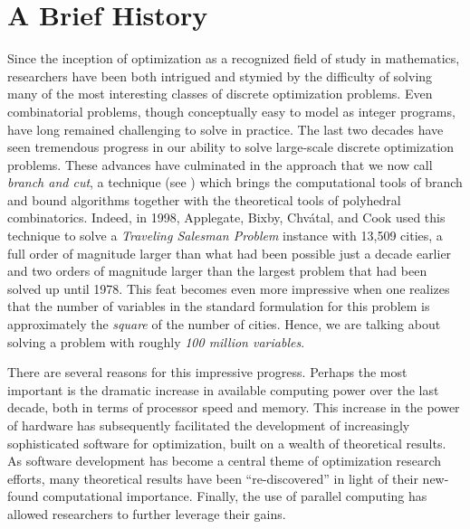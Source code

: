 \section{A Brief History}
\label{history}

Since the inception of optimization as a recognized field of study in
mathematics, researchers have been both intrigued and stymied by the
difficulty of solving many of the most interesting classes of discrete
optimization problems. Even combinatorial problems, though
conceptually easy to model as integer programs, have long remained
challenging to solve in practice. The last two decades have seen
tremendous progress in our ability to solve large-scale discrete
optimization problems. These advances have culminated in the approach
that we now call {\it branch and cut}, a technique (see \cite{GJ&R,
P&R, H&P}) which brings the computational tools of branch and bound
algorithms together with the theoretical tools of polyhedral
combinatorics. Indeed, in 1998, Applegate, Bixby, Chv\'atal, and Cook
used this technique to solve a {\em Traveling Salesman Problem}
instance with 13,509 cities, a full order of magnitude larger than
what had been possible just a decade earlier \cite{concorde} and two
orders of magnitude larger than the largest problem that had been
solved up until 1978. This feat becomes even more impressive when one
realizes that the number of variables in the standard formulation for
this problem is approximately the {\em square} of the number of
cities. Hence, we are talking about solving a problem with roughly
{\em 100 million variables}.

There are several reasons for this impressive progress. Perhaps the
most important is the dramatic increase in available computing power
over the last decade, both in terms of processor speed and memory.
This increase in the power of hardware has subsequently facilitated
the development of increasingly sophisticated software for
optimization, built on a wealth of theoretical results. As software
development has become a central theme of optimization research
efforts, many theoretical results have been ``re-discovered'' in light
of their new-found computational importance. Finally, the use of
parallel computing has allowed researchers to further leverage their
gains.

